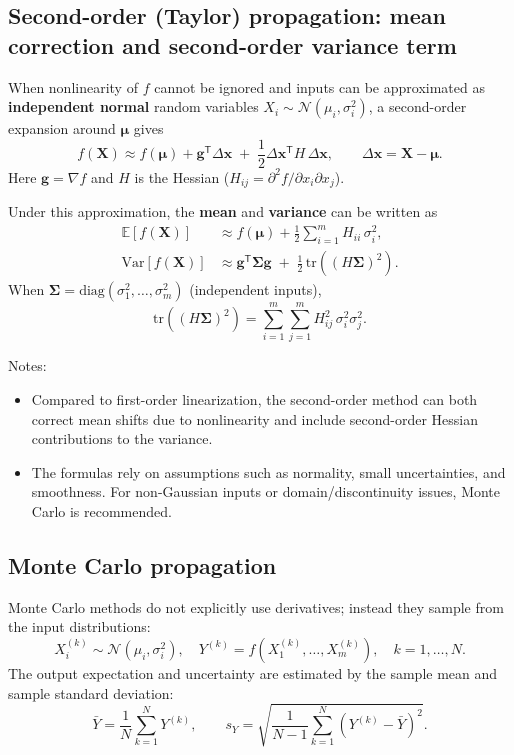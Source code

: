 \documentclass[a4paper,11pt]{article}
\begin{document}
\subsection{Second-order (Taylor) propagation: mean correction and second-order variance term}

When nonlinearity of $f$ cannot be ignored and inputs can be approximated as \textbf{independent normal} random variables
$X_i\sim\mathcal{N}(\mu_i,\sigma_i^2)$, a second-order expansion around $\bm{\mu}$ gives
\begin{equation}
f(\bm{X})\approx f(\bm{\mu})+\bm{g}^\mathsf{T}\Delta\bm{x}
\;+\;\frac{1}{2}\Delta\bm{x}^\mathsf{T}H\,\Delta\bm{x},
\qquad \Delta\bm{x}=\bm{X}-\bm{\mu}.
\end{equation}
Here $\bm{g}=\nabla f$ and $H$ is the Hessian ($H_{ij}=\partial^2 f/\partial x_i\partial x_j$).

Under this approximation, the \textbf{mean} and \textbf{variance} can be written as
\begin{align}
\mathbb{E}[f(\bm{X})] &\approx f(\bm{\mu})+\frac{1}{2}\sum_{i=1}^{m} H_{ii}\,\sigma_i^2,\\
\mathrm{Var}[f(\bm{X})] &\approx \bm{g}^\mathsf{T}\bm{\Sigma}\bm{g}
\;+\;\frac{1}{2}\,\mathrm{tr}\!\left((H\bm{\Sigma})^2\right).
\end{align}
When $\bm{\Sigma}=\mathrm{diag}(\sigma_1^2,\ldots,\sigma_m^2)$ (independent inputs),
\begin{equation}
\mathrm{tr}\!\left((H\bm{\Sigma})^2\right)=\sum_{i=1}^{m}\sum_{j=1}^{m} H_{ij}^2\,\sigma_i^2\sigma_j^2.
\end{equation}

Notes:
\begin{itemize}
  \item Compared to first-order linearization, the second-order method can both correct mean shifts due to nonlinearity and include second-order Hessian contributions to the variance.
  \item The formulas rely on assumptions such as normality, small uncertainties, and smoothness. For non-Gaussian inputs or domain/discontinuity issues, Monte Carlo is recommended.
\end{itemize}

\subsection{Monte Carlo propagation}

Monte Carlo methods do not explicitly use derivatives; instead they sample from the input distributions:
\begin{equation}
X_i^{(k)}\sim \mathcal{N}(\mu_i,\sigma_i^2),\quad
Y^{(k)} = f\!\left(X_1^{(k)},\ldots,X_m^{(k)}\right),\quad k=1,\ldots,N.
\end{equation}
The output expectation and uncertainty are estimated by the sample mean and sample standard deviation:
\begin{equation}
\bar{Y}=\frac{1}{N}\sum_{k=1}^{N}Y^{(k)},\qquad
s_Y=\sqrt{\frac{1}{N-1}\sum_{k=1}^{N}\left(Y^{(k)}-\bar{Y}\right)^2}.
\end{equation}
\end{document}
